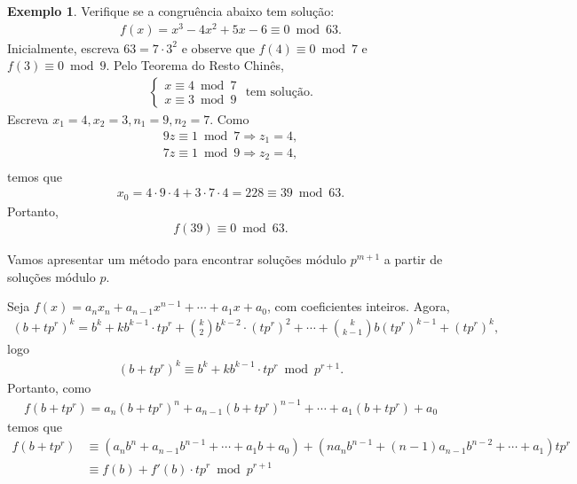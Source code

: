 \documentclass[a4paper,11pt,twoside, leqno]{article}
\theoremstyle{definition}
\newtheorem*{example}{Exemplo}
\begin{document}
\begin{example}
	Verifique se a congruência abaixo tem solução:
	\begin{align*}
	f(x) = x^3 - 4x^2 + 5x - 6\equiv 0\bmod 63.
	\end{align*}
	Inicialmente, escreva $63 = 7\cdot 3^2$ e observe que $f(4)\equiv 0\bmod 7$ e $f(3)\equiv 0\bmod 9$. Pelo Teorema do Resto Chinês, 
	\begin{align*}
	\begin{cases}
	x\equiv 4\bmod 7 \\
	x\equiv 3\bmod 9
	\end{cases}\text{ tem solução.}
	\end{align*}
	Escreva $x_1 = 4, x_2 = 3, n_1 = 9, n_2 = 7$. Como
	\begin{align*}
	9z\equiv 1\bmod 7 \Rightarrow z_1 = 4, \\
	7z\equiv 1\bmod 9 \Rightarrow z_2 = 4, \\
	\end{align*}
	temos que 
	\begin{align*}
	x_0 = 4\cdot 9\cdot 4 + 3\cdot 7\cdot 4 = 228\equiv 39\bmod 63.
	\end{align*}
	Portanto,
	\begin{align*}
	f(39)\equiv 0\bmod 63.
	\end{align*}
\end{example}
Vamos apresentar um método para encontrar soluções módulo $p^{m+1}$ a partir de soluções módulo $p$.
\par\vspace{0.3cm} Seja $f(x) = a_nx_n + a_{n-1}x^{n-1} + \cdots + a_1x + a_0$, com coeficientes inteiros. Agora,
\begin{align*}
(b + tp^r)^k = b^k + kb^{k-1}\cdot tp^r + \binom{k}{2}b^{k-2}\cdot (tp^r)^2 + \cdots + \binom{k}{k-1}b(tp^r)^{k-1} + (tp^r)^k,
\end{align*}
logo
\begin{align*}
(b + tp^r)^k \equiv b^k + kb^{k-1}\cdot tp^r\bmod p^{r+1}.
\end{align*}
Portanto, como
\begin{align*}
f(b + tp^r) = a_n(b + tp^r)^n + a_{n-1}(b + tp^r)^{n-1} + \cdots + a_1(b + tp^r) + a_0
\end{align*}
temos que
\begin{align*}
f(b + tp^r) &\equiv \left( a_nb^n + a_{n-1}b^{n-1} + \cdots + a_1b + a_0 \right) + \left( na_nb^{n-1} + (n-1)a_{n-1}b^{n-2} + \cdots + a_1 \right)tp^r \\
&\equiv f(b) + f'(b)\cdot tp^r\bmod p^{r+1}
\end{align*}
\end{document}
